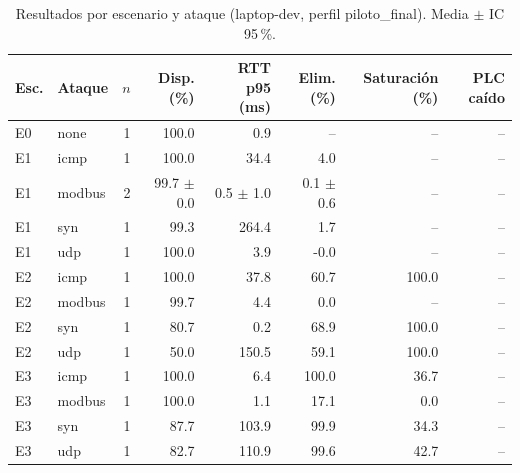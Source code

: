 \begin{table}[htbp]
\centering
\caption{Resultados por escenario y ataque (laptop-dev, perfil piloto_final). Media $\pm$ IC 95\,\%.}
\label{tab:stats-laptop-dev-piloto_final}
\scriptsize
\begin{tabular}{l l r r r r r r}
\toprule
Esc. & Ataque & $n$ & Disp. (\%) & RTT p95 (ms) & Elim. (\%) & Saturación (\%) & PLC caído \\
\midrule
E0 & none & 1 & 100.0 & 0.9 & -- & -- & -- \\
E1 & icmp & 1 & 100.0 & 34.4 & 4.0 & -- & -- \\
E1 & modbus & 2 & 99.7 $\pm$ 0.0 & 0.5 $\pm$ 1.0 & 0.1 $\pm$ 0.6 & -- & -- \\
E1 & syn & 1 & 99.3 & 264.4 & 1.7 & -- & -- \\
E1 & udp & 1 & 100.0 & 3.9 & -0.0 & -- & -- \\
E2 & icmp & 1 & 100.0 & 37.8 & 60.7 & 100.0 & -- \\
E2 & modbus & 1 & 99.7 & 4.4 & 0.0 & -- & -- \\
E2 & syn & 1 & 80.7 & 0.2 & 68.9 & 100.0 & -- \\
E2 & udp & 1 & 50.0 & 150.5 & 59.1 & 100.0 & -- \\
E3 & icmp & 1 & 100.0 & 6.4 & 100.0 & 36.7 & -- \\
E3 & modbus & 1 & 100.0 & 1.1 & 17.1 & 0.0 & -- \\
E3 & syn & 1 & 87.7 & 103.9 & 99.9 & 34.3 & -- \\
E3 & udp & 1 & 82.7 & 110.9 & 99.6 & 42.7 & -- \\
\bottomrule
\end{tabular}
\end{table}
